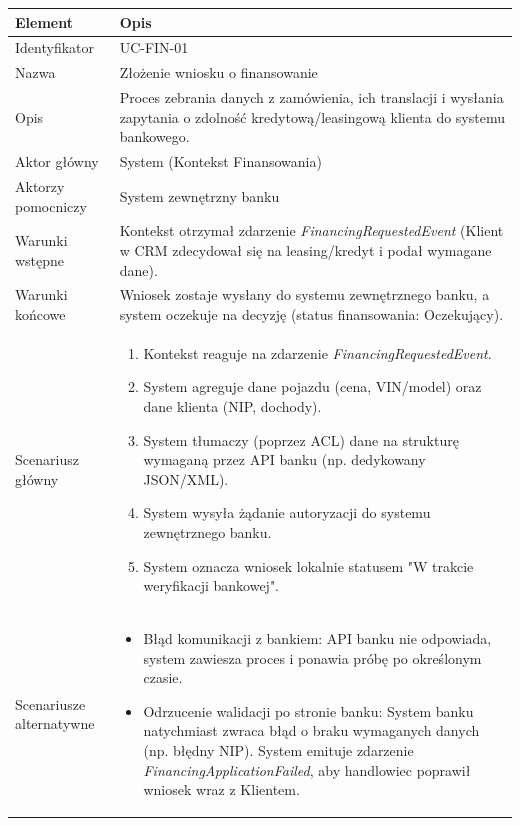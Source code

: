 \begin{longtable}{|p{4cm}|p{11cm}|}
\hline
\textbf{Element} & \textbf{Opis} \\
\hline

Identyfikator & UC-FIN-01 \\
\hline

Nazwa & Złożenie wniosku o finansowanie \\
\hline

Opis & 
Proces zebrania danych z zamówienia, ich translacji i wysłania zapytania o zdolność kredytową/leasingową klienta do systemu bankowego. \\
\hline

Aktor główny & System (Kontekst Finansowania) \\
\hline

Aktorzy pomocniczy & System zewnętrzny banku \\
\hline

Warunki wstępne & 
Kontekst otrzymał zdarzenie \textit{FinancingRequestedEvent} (Klient w CRM zdecydował się na leasing/kredyt i podał wymagane dane). \\
\hline

Warunki końcowe & 
Wniosek zostaje wysłany do systemu zewnętrznego banku, a system oczekuje na decyzję (status finansowania: Oczekujący). \\
\hline

Scenariusz główny & 
\begin{enumerate}
    \item Kontekst reaguje na zdarzenie \textit{FinancingRequestedEvent}.
    \item System agreguje dane pojazdu (cena, VIN/model) oraz dane klienta (NIP, dochody).
    \item System tłumaczy (poprzez ACL) dane na strukturę wymaganą przez API banku (np. dedykowany JSON/XML).
    \item System wysyła żądanie autoryzacji do systemu zewnętrznego banku.
    \item System oznacza wniosek lokalnie statusem "W trakcie weryfikacji bankowej".
\end{enumerate} \\
\hline

Scenariusze alternatywne & 
\begin{itemize}
    \item [A1] Błąd komunikacji z bankiem: API banku nie odpowiada, system zawiesza proces i ponawia próbę po określonym czasie.
    \item [A2] Odrzucenie walidacji po stronie banku: System banku natychmiast zwraca błąd o braku wymaganych danych (np. błędny NIP). System emituje zdarzenie \textit{FinancingApplicationFailed}, aby handlowiec poprawił wniosek wraz z Klientem.
\end{itemize} \\
\hline
\end{longtable}

